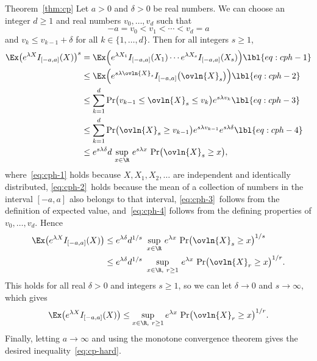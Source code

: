 \begin{pfof}{Theorem~\ref{thm:cp}}
Let $a > 0$ and $\delta > 0$ be real numbers.  We can choose an integer $d
\geq 1$ and real numbers $v_0, \ldots, v_d$ such that
\[
-a = v_0 < v_1 < \cdots < v_d = a
\]
and $v_k \leq v_{k - 1} + \delta$ for all $k \in \{1, \ldots, d\}$.  Then
for all integers $s \geq 1$, 
% 
\begin{align}
\Ex\bigl(
e^{\lambda X} I_{[-a, a]}(X) \bigr)^s   &
=
\Ex\Bigl(
e^{\lambda X_1} I_{[-a, a]}(X_1) 
\cdots
e^{\lambda X_s} I_{[-a, a]}(X_s)
\Bigr)
\lbl{eq:cph-1}        \\
&
\leq
\Ex\Bigl(
e^{s\lambda\ovln{X}_s} I_{[-a, a]}\bigl(\ovln{X}_s\bigr)
\Bigr)
\lbl{eq:cph-2}        \\
&
\leq
\sum_{k = 1}^d 
\Pr\bigl(v_{k - 1} \leq \ovln{X}_s \leq v_k\bigr) e^{s\lambda v_k}
\lbl{eq:cph-3}        \\
&
\leq
\sum_{k = 1}^d \Pr\bigl(\ovln{X}_s \geq v_{k - 1}\bigr) 
e^{s\lambda v_{k - 1}} e^{s \lambda \delta}     
\lbl{eq:cph-4}        \\
&
\leq
e^{s\lambda\delta} d \, \sup_{x \in \R} \, 
e^{s\lambda x}\, \Pr\bigl(\ovln{X}_s \geq x\bigr),
\nonumber
\end{align}
% 
where~\eqref{eq:cph-1} holds because $X, X_1, X_2, \ldots$ are independent
and identically distributed, \eqref{eq:cph-2}~holds because the mean of a
collection of numbers in the interval $[-a, a]$ also belongs to that
interval, \eqref{eq:cph-3}~follows from the definition of expected value,
and~\eqref{eq:cph-4} follows from the defining properties of $v_0, \ldots,
v_d$.  Hence
% 
\begin{align*}
\Ex\bigl(
e^{\lambda X} I_{[-a, a]}(X) 
\bigr)  &
\leq
e^{\lambda\delta} d^{1/s} \,
\,\sup_{x \in \R}\,
e^{\lambda x} \, \Pr\bigl(\ovln{X}_s \geq x\bigr)^{1/s}      \\
&
\leq
e^{\lambda \delta} d^{1/s}\,
\,\sup_{x \in \R, \ r \geq 1} \,
e^{\lambda x} \, \Pr\bigl(\ovln{X}_r \geq x\bigr)^{1/r}.
\end{align*}
% 
This holds for all real $\delta > 0$ and integers $s \geq 1$, so we can let
$\delta \to 0$ and $s \to \infty$, which gives
% 
\[
\Ex\bigl(
e^{\lambda X} I_{[-a, a]}(X) 
\bigr)  
\leq
\sup_{x \in \R, \ r \geq 1} 
e^{\lambda x} \, \Pr\bigl(\ovln{X}_r \geq x\bigr)^{1/r}.
\]
% 
Finally, letting $a \to \infty$ and using the monotone convergence theorem
gives the desired inequality~\eqref{eq:cp-hard}.
% 
% 
\end{pfof}

